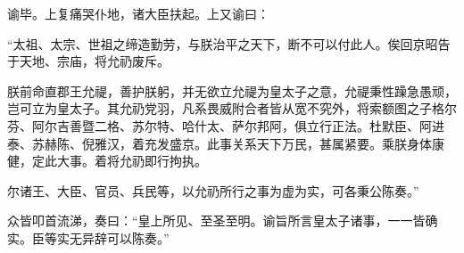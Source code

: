 
谕毕。上复痛哭仆地，诸大臣扶起。上又谕曰：



“太祖、太宗、世祖之缔造勤劳，与朕治平之天下，断不可以付此人。俟回京昭告于天地、宗庙，将允礽废斥。



朕前命直郡王允禔，善护朕躬，并无欲立允禔为皇太子之意，允禔秉性躁急愚顽，岂可立为皇太子。其允礽党羽，凡系畏威附合者皆从宽不究外，将索额图之子格尔芬、阿尔吉善暨二格、苏尔特、哈什太、萨尔邦阿，俱立行正法。杜默臣、阿进泰、苏赫陈、倪雅汉，着充发盛京。此事关系天下万民，甚属紧要。乘朕身体康健，定此大事。着将允礽即行拘执。



尔诸王、大臣、官员、兵民等，以允礽所行之事为虚为实，可各秉公陈奏。”



众皆叩首流涕，奏曰：“皇上所见、至圣至明。谕旨所言皇太子诸事，一一皆确实。臣等实无异辞可以陈奏。”

